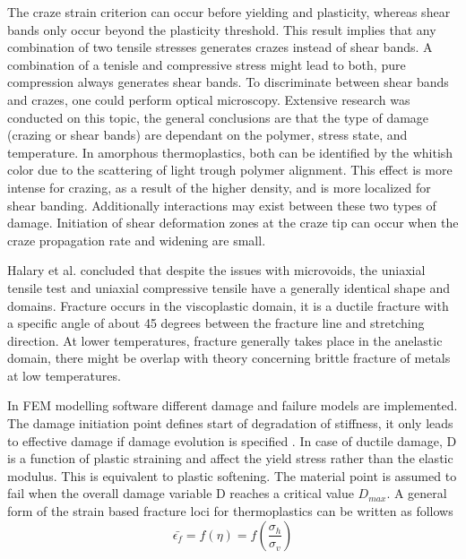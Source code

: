 The craze strain criterion can occur before yielding and plasticity, whereas shear bands only occur beyond the plasticity threshold. This result implies that any combination of two tensile stresses generates crazes instead of shear bands. A combination of a tenisle and compressive stress might lead to both, pure compression always generates shear bands.
To discriminate between shear bands and crazes, one could perform optical microscopy. Extensive research was conducted on this topic, the general conclusions are that the type of damage (crazing or shear bands) are dependant on the polymer, stress state, and temperature. In amorphous thermoplastics, both can be identified by the whitish color due to the scattering of light trough polymer alignment. This effect is more intense for crazing, as a result of the higher density, and is more localized for shear banding.
Additionally interactions may exist between these two types of damage. Initiation of shear deformation zones at the craze tip can occur when the craze propagation rate and widening are small. 

Halary et al. concluded that despite the issues with microvoids, the uniaxial tensile test and uniaxial compressive tensile have a generally identical shape and domains. Fracture occurs in the viscoplastic domain, it is a ductile fracture with a specific angle of about 45 degrees between the fracture line and stretching direction. At lower temperatures, fracture generally takes place in the anelastic domain, there might be overlap with theory concerning brittle fracture of metals at low temperatures.  

In FEM modelling software different damage and failure models are implemented. The damage initiation point defines start of degradation of stiffness, it only leads to effective damage if damage evolution is specified \cite{ABAQUS2006MaterialFailure}. In case of ductile damage, D is a function of plastic straining and affect the yield stress rather than the elastic modulus. This is equivalent to plastic softening. The material point is assumed to fail when the overall damage variable D reaches a critical value $D_{max}$.
A general form of the strain based fracture loci for thermoplastics can be written as follows
\begin{equation}\label{AzziTsai}
\bar{\epsilon_f}=f(\eta)=f(\frac{\sigma_h}{\sigma_v})
\end{equation}

